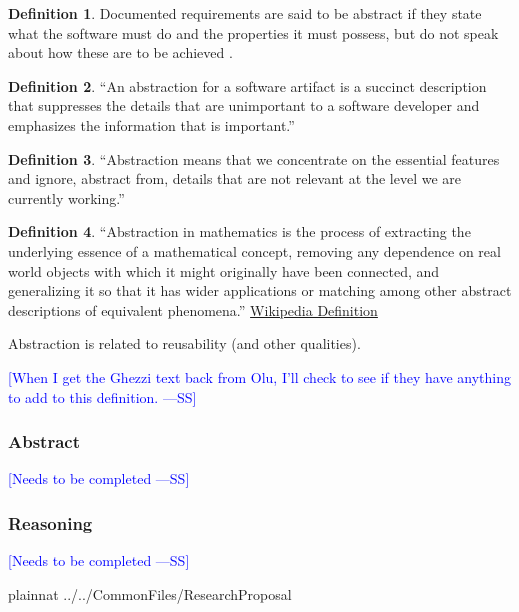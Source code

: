 \documentclass[letterpaper, cleveref]{lipics-v2019}
\newcommand{\authornote}[3]{\textcolor{#1}{[#3 ---#2]}}
\newcommand{\authornote}[3]{}
\newcommand{\wss}[1]{\authornote{blue}{SS}{#1}} %
\theoremstyle{definition}
\newtheorem{defn}{Definition}
\begin{document}
\begin{defn}
  Documented requirements are said to be abstract if they state what the
  software must do and the properties it must possess, but do not speak about
  how these are to be achieved \citep{GhezziEtAl2003}.
\end{defn}

\begin{defn}
  ``An abstraction for a software artifact is a succinct description that
  suppresses the details that are unimportant to a software developer and
  emphasizes the information that is important.'' \citep{Krueger1992}
\end{defn}

\begin{defn}
  ``Abstraction means that we concentrate on the essential features and ignore,
  abstract from, details that are not relevant at the level we are currently
  working.''  \citep[p.\ 296]{VanVliet2000}
\end{defn}

\begin{defn}
  ``Abstraction in mathematics is the process of extracting the underlying
  essence of a mathematical concept, removing any dependence on real world
  objects with which it might originally have been connected, and generalizing
  it so that it has wider applications or matching among other abstract
  descriptions of equivalent phenomena.''
  \href{https://en.wikipedia.org/wiki/Abstraction_(mathematics)} {Wikipedia
    Definition}
\end{defn}

Abstraction is related to reusability (and other qualities).

\wss{When I get the Ghezzi text back from Olu, I'll check to see if they have
  anything to add to this definition.}

\begin{mybox}
\subsubsection*{Abstract} 
\wss{Needs to be completed}
\end{mybox}

\subsubsection*{Reasoning}

\wss{Needs to be completed}


\newpage

 {plainnat}
 {../../CommonFiles/ResearchProposal}
\end{document}
